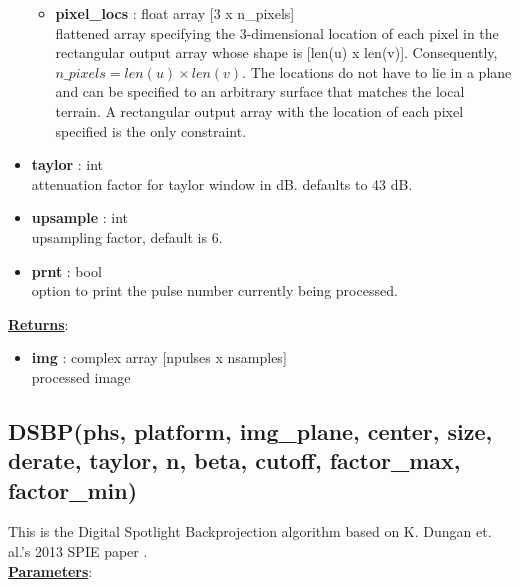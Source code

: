 \documentclass{article}
\newcommand{\defs}[2]{\textbf{{#1}} : {#2}}
\begin{document}
\begin{itemize}
\begin{itemize}
	    \item \defs{pixel\_locs}{float array [3 x n\_pixels]}\\
	    	flattened array specifying the 3-dimensional location of each pixel in the rectangular output array whose shape is [len(u) x len(v)].  Consequently, $n\_pixels = len(u) \times len(v)$.  The locations do not have to lie in a plane and can be specified to an arbitrary surface that matches the local terrain.  A rectangular output array with the location of each pixel specified is the only constraint.
	\end{itemize}
	\item\defs{taylor}{int}\\
	attenuation factor for taylor window in dB.  defaults to 43 dB.
	\item\defs{upsample}{int}\\
	upsampling factor, default is 6.
	\item\defs{prnt}{bool}\\
	option to print the pulse number currently being processed.
\end{itemize}

\noindent \underline{\textbf{Returns}}:
\begin{itemize}
	\item \defs{img}{complex array [npulses x nsamples]}\\
	processed image
\end{itemize}

\newpage

\subsection{DSBP(phs, platform, img\_plane, center, size, derate, taylor, n, beta, cutoff, factor\_max, factor\_min)}
This is the Digital Spotlight Backprojection algorithm based on K. Dungan et. al.'s 2013 SPIE paper \cite{spotlight}.\\

\noindent \underline{\textbf{Parameters}}:
\end{document}
